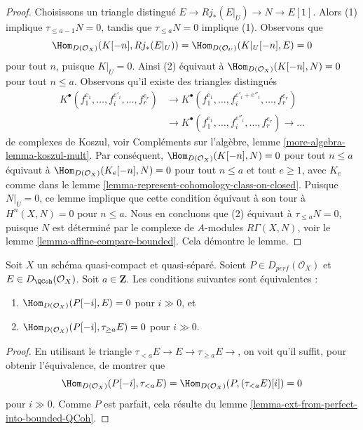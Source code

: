 \begin{proof}
Choisissons un triangle distingué $E \to Rj_*(E|_U) \to N \to E[1]$. Alors (1)
implique $\tau_{\leq a - 1}N = 0$, tandis que $\tau_{\leq a}N = 0$ implique (1).
Observons que
$$
\Hom_{D(\mathcal{O}_X)}(K[-n], Rj_*(E|_U)) =
\Hom_{D(\mathcal{O}_U)}(K|_U[-n], E) = 0
$$
pour tout $n$, puisque $K|_U = 0$. Ainsi (2) équivaut à
$\Hom_{D(\mathcal{O}_X)}(K[-n], N) = 0$ pour tout $n \leq a$. 
Observons qu'il existe des triangles distingués
$$
\begin{aligned}
K^\bullet(f_1^{e_1}, \ldots, f_i^{e'_i}, \ldots, f_r^{e_r}) &\to
K^\bullet(f_1^{e_1}, \ldots, f_i^{e'_i + e''_i}, \ldots, f_r^{e_r}) \\
{}&\to
K^\bullet(f_1^{e_1}, \ldots, f_i^{e''_i}, \ldots, f_r^{e_r}) \to \ldots
\end{aligned}
$$
de complexes de Koszul, voir
Compléments sur l'algèbre, lemme \ref{more-algebra-lemma-koszul-mult}. Par conséquent,
$\Hom_{D(\mathcal{O}_X)}(K[-n], N) = 0$ pour tout $n \leq a$
équivaut à
$\Hom_{D(\mathcal{O}_X)}(K_e[-n], N) = 0$ pour tout $n \leq a$ et tout $e \geq 1$,
avec $K_e$ comme dans le lemme \ref{lemma-represent-cohomology-class-on-closed}.
Puisque $N|_U = 0$, ce lemme implique que cette condition équivaut à son tour à
$H^n(X, N) = 0$ pour $n \leq a$. Nous en concluons que (2) équivaut à
$\tau_{\leq a}N = 0$, puisque $N$ est déterminé par le complexe de
$A$-modules $R\Gamma(X, N)$, voir le lemme \ref{lemma-affine-compare-bounded}.
Cela démontre le lemme.
\end{proof}

\begin{lemma}
\label{lemma-bounded-truncation}
Soit $X$ un schéma quasi-compact et quasi-séparé.
Soient $P \in D_{perf}(\mathcal{O}_X)$ et $E \in D_{\QCoh}(\mathcal{O}_X)$. 
Soit $a \in \mathbf{Z}$. Les conditions suivantes sont équivalentes :
\begin{enumerate}
\item $\Hom_{D(\mathcal{O}_X)}(P[-i], E) = 0$ pour $i \gg 0$, et
\item $\Hom_{D(\mathcal{O}_X)}(P[-i], \tau_{\geq a} E) = 0$ pour $i \gg 0$.
\end{enumerate}
\end{lemma}

\begin{proof}
En utilisant le triangle $ \tau_{< a} E \to E \to \tau_{\geq a} E \to$,
on voit qu'il suffit, pour obtenir l'équivalence, de montrer que
$$
\Hom_{D(\mathcal{O}_X)}(P[-i], \tau_{< a} E) =
\Hom_{D(\mathcal{O}_X)}(P, (\tau_{< a} E)[i]) = 0 
$$
pour $i \gg 0$. Comme $P$ est parfait, cela résulte du
lemme \ref{lemma-ext-from-perfect-into-bounded-QCoh}.
\end{proof}

